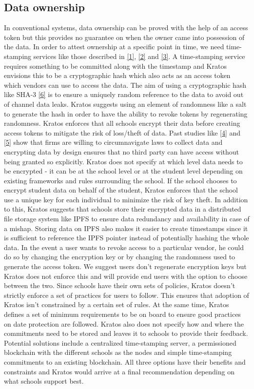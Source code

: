 \documentclass{article}
\begin{document}
\subsection{Data ownership}
In conventional systems, data ownership can be proved with the help of an access token but this provides no guarantee on when the owner came into possession of the data. In order to attest ownership at a specific point in time, we need time-stamping services like those described in \hyperref[sec:1]{[1]}, \hyperref[sec:2]{[2]} and \hyperref[sec:3]{[3]}. A time-stamping service requires something to be committed along with the timestamp and Kratos envisions this to be a cryptographic hash which also acts as an access token which vendors can use to access the data.
\bigbreak
The aim of using a cryptographic hash like SHA-3 \hyperref[sec:6]{[6]} is to ensure a uniquely random reference to the data to avoid out of channel data leaks. Kratos suggests using an element of randomness like a salt to generate the hash in order to have the ability to revoke tokens by regenerating randomness. Kratos enforces that all schools encrypt their data before creating access tokens to mitigate the risk of loss/theft of data. Past studies like \hyperref[sec:4]{[4]} and \hyperref[sec:5]{[5]} show that firms are willing to circumnavigate laws to collect data and encrypting data by design ensures that no third party can have access without being granted so explicitly.
\bigbreak
Kratos does not specify at which level data needs to be encrypted - it can be at the school level or at the student level depending on existing frameworks and rules surrounding the school. If the school chooses to encrypt student data on behalf of the student, Kratos enforces that the school use a unique key for each individual to minimize the risk of key theft. In addition to this, Kratos suggests that schools store their encrypted data in a distributed file storage system like IPFS to ensure data redundancy and availability in case of a mishap. Storing data on IPFS also makes it easier to create timestamps since it is sufficient to reference the IPFS pointer instead of potentially hashing the whole data.
\bigbreak
In the event a user wants to revoke access to a particular vendor, he could do so by changing the encryption key or by changing the randomness used to generate the access token. We suggest users don't regenerate encryption keys but Kratos does not enforce this and will provide end users with the option to choose between the two.
\bigbreak
Since schools have their own sets of policies, Kratos doesn't strictly enforce a set of practices for users to follow. This ensures that adoption of Kratos isn't constrained by a certain set of rules. At the same time, Kratos defines a set of minimum requirements to be on board to ensure good practices on date protection are followed.
\bigbreak
Kratos also does not specify how and where the commitments need to be stored and leaves it to schools to provide their feedback. Potential solutions include a centralized time-stamping server, a permissioned blockchain with the different schools as the nodes and simple time-stamping commitments to an existing blockchain. All three options have their benefits and constraints and Kratos would arrive at a final recommendation depending on what schools support best.
\bigbreak
\end{document}
